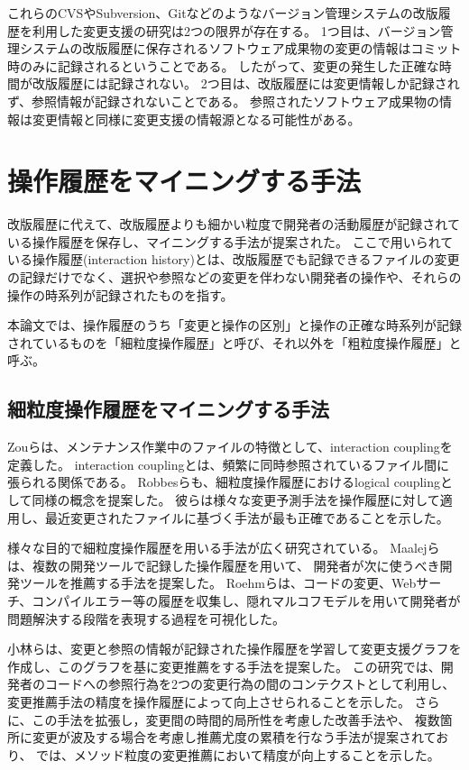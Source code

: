 \documentclass[a4paper]{jsbook}
\begin{document}
これらのCVSやSubversion、Gitなどのようなバージョン管理システムの改版履歴を利用した変更支援の研究は2つの限界が存在する。
1つ目は、バージョン管理システムの改版履歴に保存されるソフトウェア成果物の変更の情報はコミット時のみに記録されるということである。
したがって、変更の発生した正確な時間が改版履歴には記録されない。
2つ目は、改版履歴には変更情報しか記録されず、参照情報が記録されないことである。
参照されたソフトウェア成果物の情報は変更情報と同様に変更支援の情報源となる可能性がある。
\section{操作履歴をマイニングする手法}
改版履歴に代えて、改版履歴よりも細かい粒度で開発者の活動履歴が記録されている操作履歴を保存し、マイニングする手法が提案された\cite{Hill:1992}。
ここで用いられている操作履歴(interaction history)とは、改版履歴でも記録できるファイルの変更の記録だけでなく、選択や参照などの変更を伴わない開発者の操作や、それらの操作の時系列が記録されたものを指す。

本論文では、操作履歴のうち「変更と操作の区別」と操作の正確な時系列が記録されているものを「細粒度操作履歴」と呼び、それ以外を「粗粒度操作履歴」と呼ぶ。
\subsection{細粒度操作履歴をマイニングする手法}
Zouら\cite{4268248}は、メンテナンス作業中のファイルの特徴として、interaction couplingを定義した。
interaction couplingとは、頻繁に同時参照されているファイル間に張られる関係である。
Robbesら\cite{Robbes:2008}も、細粒度操作履歴におけるlogical couplingとして同様の概念を提案した。
彼らは様々な変更予測手法を操作履歴に対して適用し、最近変更されたファイルに基づく手法が最も正確であることを示した\cite{5463278}。

様々な目的で細粒度操作履歴を用いる手法が広く研究されている。
Maalejら\cite{Maalej:2010}は、複数の開発ツールで記録した操作履歴を用いて、
開発者が次に使うべき開発ツールを推薦する手法を提案した。
Roehmらは、コードの変更、Webサーチ、コンパイルエラー等の履歴を収集し、隠れマルコフモデルを用いて開発者が問題解決する段階を表現する過程を可視化した。

小林ら\cite{6233415,KatoJapanese:2011}は、変更と参照の情報が記録された操作履歴を学習して変更支援グラフを作成し、このグラフを基に変更推薦をする手法を提案した。
この研究では、開発者のコードへの参照行為を2つの変更行為の間のコンテクストとして利用し、変更推薦手法の精度を操作履歴によって向上させられることを示した。
さらに、この手法を拡張し，変更間の時間的局所性を考慮した改善手法\cite{ss2012-76}や、
複数箇所に変更が波及する場合を考慮し推薦尤度の累積を行なう手法\cite{ss2013-84,Yamamori:2016}が提案されており、
\cite{Yamamori:2016}では、メソッド粒度の変更推薦において精度が向上することを示した。
\end{document}
